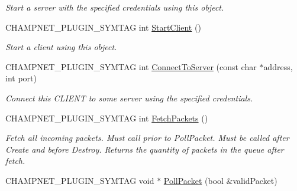 \begin{DoxyCompactItemize}
\begin{DoxyCompactList}\small\item\em Start a server with the specified credentials using this object. \end{DoxyCompactList}\item 
\hypertarget{namespace_champ_net_plugin_ab92621bbf98ccf055d3a884220d5577e}{C\-H\-A\-M\-P\-N\-E\-T\-\_\-\-P\-L\-U\-G\-I\-N\-\_\-\-S\-Y\-M\-T\-A\-G int \hyperlink{namespace_champ_net_plugin_ab92621bbf98ccf055d3a884220d5577e}{Start\-Client} ()}\label{namespace_champ_net_plugin_ab92621bbf98ccf055d3a884220d5577e}

\begin{DoxyCompactList}\small\item\em Start a client using this object. \end{DoxyCompactList}\item 
\hypertarget{namespace_champ_net_plugin_ae65d85077ea14169471c94ef9412db81}{C\-H\-A\-M\-P\-N\-E\-T\-\_\-\-P\-L\-U\-G\-I\-N\-\_\-\-S\-Y\-M\-T\-A\-G int \hyperlink{namespace_champ_net_plugin_ae65d85077ea14169471c94ef9412db81}{Connect\-To\-Server} (const char $\ast$address, int port)}\label{namespace_champ_net_plugin_ae65d85077ea14169471c94ef9412db81}

\begin{DoxyCompactList}\small\item\em Connect this C\-L\-I\-E\-N\-T to some server using the specified credentials. \end{DoxyCompactList}\item 
\hypertarget{namespace_champ_net_plugin_a6fb34db2c53b323bf7c1ff054de6b5f5}{C\-H\-A\-M\-P\-N\-E\-T\-\_\-\-P\-L\-U\-G\-I\-N\-\_\-\-S\-Y\-M\-T\-A\-G int \hyperlink{namespace_champ_net_plugin_a6fb34db2c53b323bf7c1ff054de6b5f5}{Fetch\-Packets} ()}\label{namespace_champ_net_plugin_a6fb34db2c53b323bf7c1ff054de6b5f5}

\begin{DoxyCompactList}\small\item\em Fetch all incoming packets. Must call prior to Poll\-Packet. Must be called after Create and before Destroy. Returns the quantity of packets in the queue after fetch. \end{DoxyCompactList}\item 
\hypertarget{namespace_champ_net_plugin_abb7c7dca9d557ab9cd6b29fbb6a75785}{C\-H\-A\-M\-P\-N\-E\-T\-\_\-\-P\-L\-U\-G\-I\-N\-\_\-\-S\-Y\-M\-T\-A\-G void $\ast$ \hyperlink{namespace_champ_net_plugin_abb7c7dca9d557ab9cd6b29fbb6a75785}{Poll\-Packet} (bool \&valid\-Packet)}\label{namespace_champ_net_plugin_abb7c7dca9d557ab9cd6b29fbb6a75785}


\end{DoxyCompactItemize}
